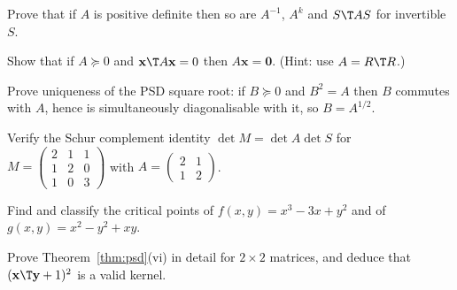 \begin{exercise}
Prove that if $A$ is positive definite then so are $A^{-1}$, $A^k$ and $S\T AS$ for invertible $S$.
\end{exercise}

\begin{exercise}
Show that if $A\succeq0$ and $\mathbf{x}\T A\mathbf{x}=0$ then $A\mathbf{x}=\mathbf{0}$. (Hint: use $A=R\T R$.)
\end{exercise}

\begin{exercise}
Prove uniqueness of the PSD square root: if $B\succeq0$ and $B^2=A$ then $B$ commutes with $A$, hence is simultaneously diagonalisable with it, so $B=A^{1/2}$.
\end{exercise}

\begin{exercise}
Verify the Schur complement identity $\det M=\det A\det S$ for $M=\begin{pmatrix}2&1&1\\1&2&0\\1&0&3\end{pmatrix}$ with $A=\begin{pmatrix}2&1\\1&2\end{pmatrix}$.
\end{exercise}

\begin{exercise}
Find and classify the critical points of $f(x,y)=x^3-3x+y^2$ and of $g(x,y)=x^2-y^2+xy$.
\end{exercise}

\begin{exercise}
Prove Theorem~\ref{thm:psd}(vi) in detail for $2\times 2$ matrices, and deduce that $(\mathbf{x}\T\mathbf{y}+1)^2$ is a valid kernel.
\end{exercise}
